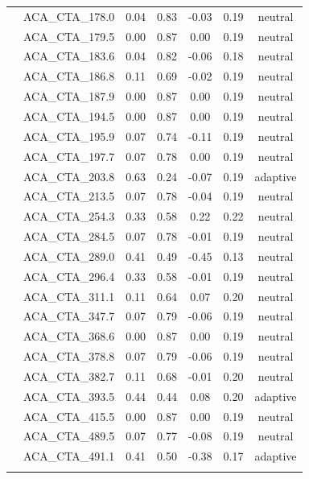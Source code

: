 \documentclass[11pt,]{article}
\begin{document}
\begin{longtable}[c]{@{}lcccccc@{}}
\\\addlinespace
& ACA\_CTA\_178.0 & 0.04 & 0.83 & -0.03 & 0.19 & neutral
\\\addlinespace
& ACA\_CTA\_179.5 & 0.00 & 0.87 & 0.00 & 0.19 & neutral
\\\addlinespace
& ACA\_CTA\_183.6 & 0.04 & 0.82 & -0.06 & 0.18 & neutral
\\\addlinespace
& ACA\_CTA\_186.8 & 0.11 & 0.69 & -0.02 & 0.19 & neutral
\\\addlinespace
& ACA\_CTA\_187.9 & 0.00 & 0.87 & 0.00 & 0.19 & neutral
\\\addlinespace
& ACA\_CTA\_194.5 & 0.00 & 0.87 & 0.00 & 0.19 & neutral
\\\addlinespace
& ACA\_CTA\_195.9 & 0.07 & 0.74 & -0.11 & 0.19 & neutral
\\\addlinespace
& ACA\_CTA\_197.7 & 0.07 & 0.78 & 0.00 & 0.19 & neutral
\\\addlinespace
& ACA\_CTA\_203.8 & 0.63 & 0.24 & -0.07 & 0.19 & adaptive
\\\addlinespace
& ACA\_CTA\_213.5 & 0.07 & 0.78 & -0.04 & 0.19 & neutral
\\\addlinespace
& ACA\_CTA\_254.3 & 0.33 & 0.58 & 0.22 & 0.22 & neutral
\\\addlinespace
& ACA\_CTA\_284.5 & 0.07 & 0.78 & -0.01 & 0.19 & neutral
\\\addlinespace
& ACA\_CTA\_289.0 & 0.41 & 0.49 & -0.45 & 0.13 & neutral
\\\addlinespace
& ACA\_CTA\_296.4 & 0.33 & 0.58 & -0.01 & 0.19 & neutral
\\\addlinespace
& ACA\_CTA\_311.1 & 0.11 & 0.64 & 0.07 & 0.20 & neutral
\\\addlinespace
& ACA\_CTA\_347.7 & 0.07 & 0.79 & -0.06 & 0.19 & neutral
\\\addlinespace
& ACA\_CTA\_368.6 & 0.00 & 0.87 & 0.00 & 0.19 & neutral
\\\addlinespace
& ACA\_CTA\_378.8 & 0.07 & 0.79 & -0.06 & 0.19 & neutral
\\\addlinespace
& ACA\_CTA\_382.7 & 0.11 & 0.68 & -0.01 & 0.20 & neutral
\\\addlinespace
& ACA\_CTA\_393.5 & 0.44 & 0.44 & 0.08 & 0.20 & adaptive
\\\addlinespace
& ACA\_CTA\_415.5 & 0.00 & 0.87 & 0.00 & 0.19 & neutral
\\\addlinespace
& ACA\_CTA\_489.5 & 0.07 & 0.77 & -0.08 & 0.19 & neutral
\\\addlinespace
& ACA\_CTA\_491.1 & 0.41 & 0.50 & -0.38 & 0.17 & adaptive
\\\addlinespace

\end{longtable}
\end{document}
